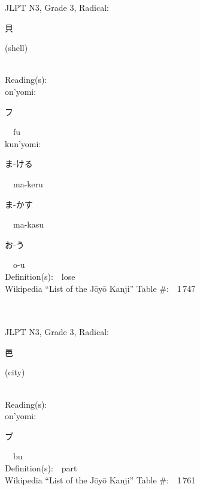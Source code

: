 \begin{multicols}{2}
{JLPT N3, Grade 3, Radical:\ \ {\begin{CJK}{UTF8}{min} 貝 \end{CJK}} (shell) } \\
Reading(s):\ \ \\
{\hspace*{1em}}on'yomi:\ \ \\
{\hspace*{2em}}{\begin{CJK}{UTF8}{min} フ \end{CJK}}\ \ fu\ \ \\
{\hspace*{1em}}kun'yomi:\ \ \\
{\hspace*{2em}}{\begin{CJK}{UTF8}{min} ま-ける \end{CJK}}\ \ ma-keru\ \ \\
{\hspace*{2em}}{\begin{CJK}{UTF8}{min} ま-かす \end{CJK}}\ \ ma-kasu\ \ \\
{\hspace*{2em}}{\begin{CJK}{UTF8}{min} お-う \end{CJK}}\ \ o-u\ \ \\
Definition(s):\ \ lose \\
Wikipedia ``List of the J\=oy\=o Kanji'' Table \#:\ \ 1\,747 \\
\ \ \\
{\fontsize{34pt}{40pt}  }\ \ \\  %
{JLPT N3, Grade 3, Radical:\ \ {\begin{CJK}{UTF8}{min} 邑 \end{CJK}} (city) } \\
Reading(s):\ \ \\
{\hspace*{1em}}on'yomi:\ \ \\
{\hspace*{2em}}{\begin{CJK}{UTF8}{min} ブ \end{CJK}}\ \ bu\ \ \\
Definition(s):\ \ part \\
Wikipedia ``List of the J\=oy\=o Kanji'' Table \#:\ \ 1\,761 \\

\end{multicols}
